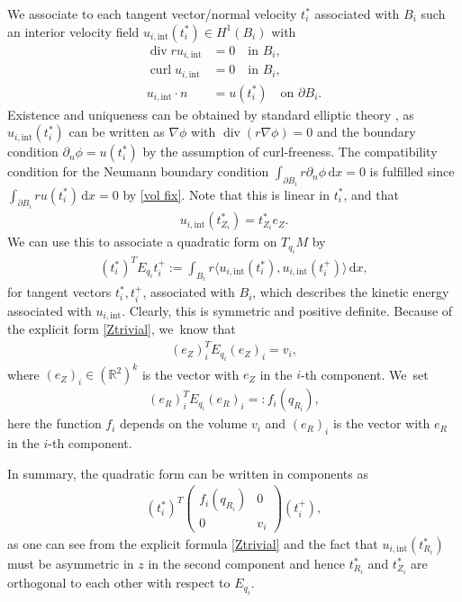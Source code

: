 \documentclass[10pt]{amsart}
\theoremstyle{definition}
\renewcommand{\div}{\operatorname{div}}
\DeclareMathOperator{\curl}{curl}
\newcommand\R{\mathbb{R}}
\newcommand\scalar[2]{\langle #1,#2\rangle}
\newcommand\eq{=}
\newcommand\dd{\,\mathrm{d}}
\newcommand\dx{\dd x}
\let\de\partial
\begin{document}
We associate to each tangent vector/normal velocity $t_i^*$ associated with $B_i$ such an interior velocity field $u_{i,\mathrm{int}}(t_i^*)\in H^1(B_i)$ with
\begin{align}
\div ru_{i,\mathrm{int}}&\eq0 \quad\text{in $B_i$},\label{Int1}\\
\curl u_{i,\mathrm{int}}&\eq0 \quad\text{in $B_i$},\label{Int2}\\
u_{i,\mathrm{int}}\cdot n&\eq u(t_i^*)\quad\text{on $\de B_i$.}\label{Int3}
\end{align}
Existence and uniqueness can be obtained by standard elliptic theory \cite[Chap.\,6]{evans2022partial}, as~$u_{i,\mathrm{int}}(t_i^*)$ can be written as $\nabla \phi$ with $\div(r\nabla \phi)=0$ and the boundary condition $\de_n \phi=u(t_i^*)$ by the assumption of curl-freeness. The compatibility condition for the Neumann boundary condition $\int_{\de B_i} r\de_n \phi\dx=0$ is fulfilled since $\int_{\de B_i} r u(t_i^*)\dx=0$ by \eqref{vol fix}.
Note that this is linear in $t_i^*$, and that
\begin{align}\label{Ztrivial}u_{i,\mathrm{int}}(t_{Z_i}^*)=t_{Z_i}^*e_Z.
\end{align}
We can use this to associate a quadratic form on $T_{q_i}M$ by
\begin{align}
(t_i^*)^TE_{q_i}t_i^+:=\int_{B_i}r\scalar{u_{i,\mathrm{int}}(t_i^*)}{u_{i,\mathrm{int}}(t_i^+)}\dx, \label{def E}
\end{align}
for tangent vectors $t_i^*,t_i^+$, associated with $B_i$, which describes the kinetic energy associated with $u_{i,\mathrm{int}}$. Clearly, this is symmetric and positive definite. Because of the explicit form \eqref{Ztrivial}, we~know that
\begin{align*}
(e_Z)_i^TE_{q_i}(e_Z)_i\eq v_i,
\end{align*}
where $(e_Z)_i\in (\R^2)^k$ is the vector with $e_Z$ in the $i$-th component. We~set
\begin{align}
(e_R)_i^TE_{q_i}(e_R)_i=: f_i(q_{R_i})\label{def f},
\end{align}
here the function $f_i$ depends on the volume $v_i$ and $(e_R)_i$ is the vector with $e_R$ in the $i$-th component.

In summary, the quadratic form can be written in components as
\begin{align}
(t_i^*)^T\begin{pmatrix} f_i(q_{R_i}) & 0\\ 0 & v_i\end{pmatrix}(t_i^+),\label{def f 2}
\end{align}
as one can see from the explicit formula \eqref{Ztrivial} and the fact that $u_{i,\mathrm{int}}(t_{R_i}^*)$ must be asymmetric in $z$ in the second component and hence $t_{R_i}^*$ and $t_{Z_i}^*$ are orthogonal to each other with respect to $E_{q_i}$.
\end{document}
